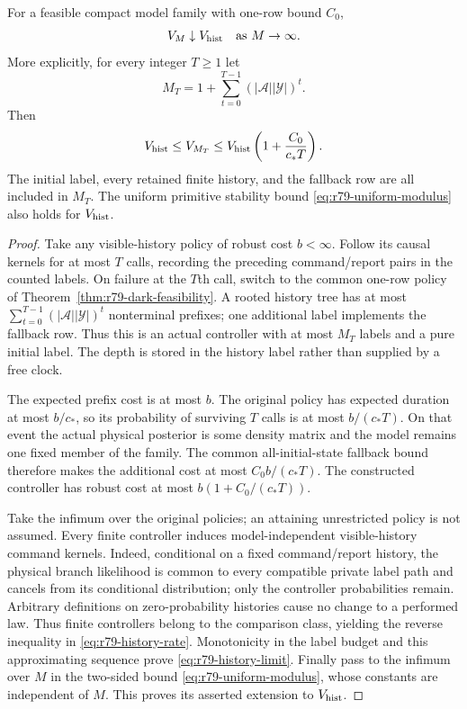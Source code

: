 \begin{corollary}
\label{cor:r79-history-limit}
For a feasible compact model family with one-row bound $C_0$,
\begin{equation}\label{eq:r79-history-limit}
 V_M\downarrow V_{\rm hist}\quad\hbox{as }M\to\infty.
\end{equation}
More explicitly, for every integer $T\ge1$ let
\[
 M_T=1+\sum_{t=0}^{T-1}(|\mathcal A||\mathcal Y|)^t.
\]
Then
\begin{equation}\label{eq:r79-history-rate}
 V_{\rm hist}\le V_{M_T}
       \le V_{\rm hist}
                    \left(1+\frac{C_0}{c_*T}\right).
\end{equation}
The initial label, every retained finite history, and the fallback
row are all included in $M_T$.  The uniform primitive stability
bound \eqref{eq:r79-uniform-modulus} also holds for
$V_{\rm hist}$.
\end{corollary}
\begin{proof}
Take any visible-history policy of robust cost $b<\infty$.  Follow
its causal kernels for at most $T$ calls, recording the preceding
command/report pairs in the counted labels.  On failure at the
$T$th call, switch to the common one-row policy of
Theorem~\ref{thm:r79-dark-feasibility}.  A rooted history tree has
at most $\sum_{t=0}^{T-1}(|\mathcal A||\mathcal Y|)^t$ nonterminal
prefixes; one additional label implements the fallback row.  Thus
this is an actual controller with at most $M_T$ labels and a pure
initial label.  The depth is stored in the history label rather
than supplied by a free clock.

The expected prefix cost is at most $b$.  The original policy has
expected duration at most $b/c_*$, so its probability of surviving
$T$ calls is at most $b/(c_*T)$.  On that event the actual physical
posterior is some density matrix and the model remains one fixed
member of the family.  The common all-initial-state fallback bound
therefore makes the additional cost at most
$C_0b/(c_*T)$.  The constructed controller has robust cost at most
$b(1+C_0/(c_*T))$.

Take the infimum over the original policies; an attaining
unrestricted policy is not assumed.  Every finite controller induces model-independent visible-history
command kernels.  Indeed, conditional on a fixed command/report
history, the physical branch likelihood is common to every compatible
private label path and cancels from its conditional distribution;
only the controller probabilities remain.  Arbitrary definitions on
zero-probability histories cause no change to a performed law.  Thus
finite controllers belong to the comparison class, yielding the
reverse inequality in \eqref{eq:r79-history-rate}.  Monotonicity in the label budget
and this approximating sequence prove
\eqref{eq:r79-history-limit}.  Finally pass to the infimum over
$M$ in the two-sided bound
\eqref{eq:r79-uniform-modulus}, whose constants are independent of
$M$.  This proves its asserted extension to $V_{\rm hist}$.
\end{proof}

